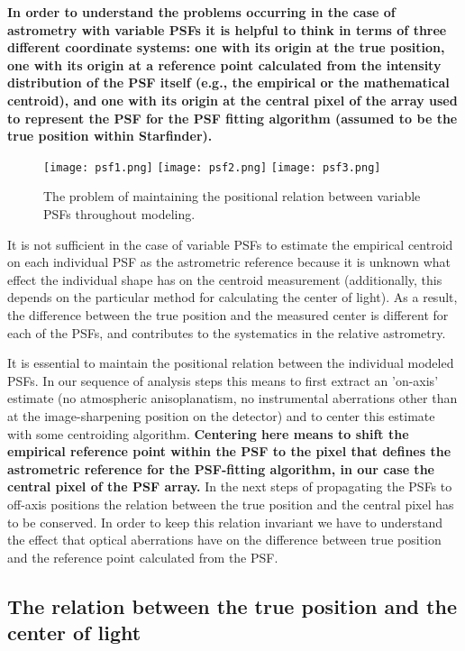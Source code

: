 {\bf In order to understand the problems occurring in the case of astrometry with variable PSFs it is helpful to think in terms of three different coordinate systems: one with its origin at the true position, one with its origin at a reference point calculated from the intensity distribution of the PSF itself (e.g., the empirical or the mathematical centroid), and one with its origin at the central pixel of the array used to represent the PSF for the PSF fitting algorithm (assumed to be the true position within Starfinder).}

\begin{figure}[h!]
\centering
\texttt{[image: psf1.png]}
\texttt{[image: psf2.png]}
\texttt{[image: psf3.png]}
\caption{\label{fig:frog}The problem of maintaining the positional relation between variable PSFs throughout modeling.}
\end{figure}

It is not sufficient in the case of variable PSFs to estimate the empirical centroid on each individual PSF as the astrometric reference because it is unknown what effect the individual shape has on the centroid measurement (additionally, this depends on the particular method for calculating the center of light). As a result, the difference between the true position and the measured center is different for each of the PSFs, and contributes to the systematics in the relative astrometry.

It is essential to maintain the positional relation between the individual modeled PSFs. In our sequence of analysis steps this means to first extract an 'on-axis' estimate (no atmospheric anisoplanatism, no instrumental aberrations other than at the image-sharpening position on the detector) and to center this estimate with some centroiding algorithm. {\bf Centering here means to shift the empirical reference point within the PSF to the pixel that defines the astrometric reference for the PSF-fitting algorithm, in our case the central pixel of the PSF array.} In the next steps of propagating the PSFs to off-axis positions the relation between the true position and the central pixel has to be conserved. In order to keep this relation invariant we have to understand the effect that optical aberrations have on the difference between true position and the reference point calculated from the PSF.  

\subsection{The relation between the true position and the center of light}


